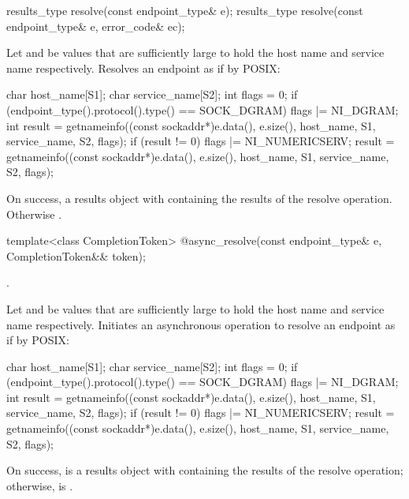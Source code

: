 \begin{itemdecl}
results_type resolve(const endpoint_type& e);
results_type resolve(const endpoint_type& e, error_code& ec);
\end{itemdecl}

\begin{itemdescr}
\pnum
\effects Let  and  be  values that are sufficiently large to hold the host name and service name respectively. Resolves an endpoint as if by POSIX:
\begin{codeblock}
char host_name[S1];
char service_name[S2];
int flags = 0;
if (endpoint_type().protocol().type() == SOCK_DGRAM)
  flags |= NI_DGRAM;
int result = getnameinfo((const sockaddr*)e.data(), e.size(),
                         host_name, S1,
                         service_name, S2,
                         flags);
if (result != 0)
{
  flags |= NI_NUMERICSERV;
  result = getnameinfo((const sockaddr*)e.data(), e.size(),
                       host_name, S1,
                       service_name, S2,
                       flags);
}
\end{codeblock}


\pnum
\returns On success, a results object with  containing the results of the resolve operation. Otherwise .
\end{itemdescr}

\begin{itemdecl}
template<class CompletionToken>
  @\DEDUCED@ async_resolve(const endpoint_type& e,
                        CompletionToken&& token);
\end{itemdecl}

\begin{itemdescr}
\pnum
\completionsig {}.

\pnum
\effects Let  and  be  values that are sufficiently large to hold the host name and service name respectively. Initiates an asynchronous operation to resolve an endpoint as if by POSIX:
\begin{codeblock}
char host_name[S1];
char service_name[S2];
int flags = 0;
if (endpoint_type().protocol().type() == SOCK_DGRAM)
  flags |= NI_DGRAM;
int result = getnameinfo((const sockaddr*)e.data(), e.size(),
                         host_name, S1,
                         service_name, S2,
                         flags);
if (result != 0)
{
  flags |= NI_NUMERICSERV;
  result = getnameinfo((const sockaddr*)e.data(), e.size(),
                       host_name, S1,
                       service_name, S2,
                       flags);
}
\end{codeblock}
 On success,  is a results object with  containing the results of the resolve operation; otherwise,  is .
\end{itemdescr}




